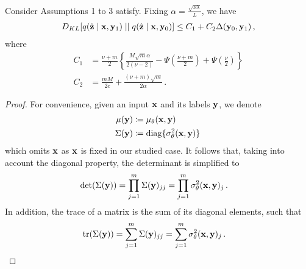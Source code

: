 {\begin{lemma}
\label{lem:student_bound}
Consider Assumptions 1 to 3 satisfy. 
Fixing $\alpha = \frac{\sqrt{\nu \lambda}}{L}$, we have 
\begin{align}
D_{KL}[ q(\hat{\mathbf{z}} \mid \mathbf{x}, \mathbf{y}_1) \mid\mid q(\hat{\mathbf{z}} \mid \mathbf{x}, \mathbf{y}_0)] 
\le C_1 + C_2 \Delta(\mathbf{y}_0, \mathbf{y}_1) \label{eq:gap_ineq} \,, 
\end{align}
where 
\begin{align*}
  C_1 &= \frac{\nu+m}{2} \left\{ \frac{M \sqrt{m} \alpha}{2(\nu-2) }  - \Psi\left( \frac{\nu + m}{2} \right) + \Psi\left(\frac{\nu}{2} \right) \right\} \\
  C_2 &= \frac{m M}{2e} + \frac{(\nu+m) \sqrt{m}}{2\alpha}  \,.
\end{align*}
\end{lemma}

\begin{proof}
For convenience, given an input $\mathbf{x}$ and its labels $\mathbf{y}$, we denote 
\begin{align*}
\mu(\mathbf{y}) &\coloneqq \mu_{\theta}(\mathbf{x}, \mathbf{y}) \\
\Sigma(\mathbf{y}) &\coloneqq \mathrm{diag}\{ \sigma^2_{\theta}(\mathbf{x}, \mathbf{y}) \} \, 
\end{align*}
which omits $\mathbf{x}$ as $\mathbf{x}$ is fixed in our studied case. 
It follows that, taking into account the diagonal property, the determinant is simplified to
\begin{align}
  \mathrm{det}(\Sigma(\mathbf{y})) &= \prod_{j=1}^{m} \Sigma(\mathbf{y})_{jj} = \prod_{j=1}^{m} \sigma^2_{\theta}(\mathbf{x}, \mathbf{y})_{j} \label{eq:det} \,.
\end{align}
In addition, the trace of a matrix is the sum of its diagonal elements, such that 
\begin{align}
  \mathrm{tr}(\Sigma(\mathbf{y})) &= \sum_{j=1}^{m} \Sigma(\mathbf{y})_{jj} = \sum_{j=1}^{m} \sigma^2_{\theta}(\mathbf{x}, \mathbf{y})_{j} \label{eq:trace} \,.
\end{align}


\end{proof}}
